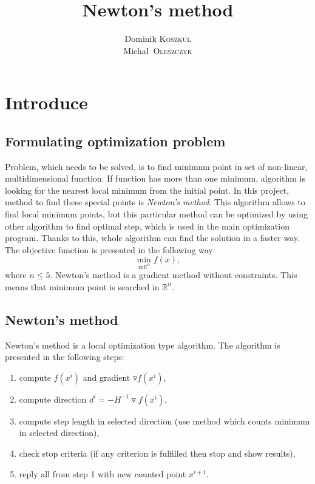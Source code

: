 \documentclass[12pt]{article}
\title{Newton's method} %
\author{Dominik \textsc{Koszkul} \\ Micha\l\ \textsc{Oleszczyk}} %
\begin{document}
\maketitle %

\section{Introduce}

\subsection{Formulating optimization problem}
Problem, which needs to be solved, is to find minimum point in set of non-linear, multidimensional function. If function has more than one minimum, algorithm is looking for the nearest local minimum from the initial point. In this project, method to find these special points is \textit{Newton's method}. This algorithm allows to find local minimum points, but this particular method can be optimized by using other algorithm to find optimal step, which is used in the main optimization program. Thanks to this, whole algorithm can find the solution in a faster way. The objective function is presented in the following way
\begin{equation}
\min\limits_{x \epsilon \mathbb{R}^n} f(x) ,
\end{equation}
where $n \leqslant 5$. Newton's method is a gradient method without constraints. This means that minimum point is searched in $\mathbb{R}^n$.


\subsection{Newton's method}
Newton's method is a local optimization type algorithm. The algorithm is presented in the following steps:
\begin{enumerate}
\item compute $f(x^i)$ and gradient $\triangledown f(x^i)$,
\item compute direction $d^i=-H^{-1} \triangledown f(x^i)$,
\item compute step length in selected direction (use method which counts minimum in selected direction),
\item check stop criteria (if any criterion is fulfilled then stop and show results),
\item reply all from step 1 with new counted point $x^{i+1}$.
\end{enumerate}
\end{document}
